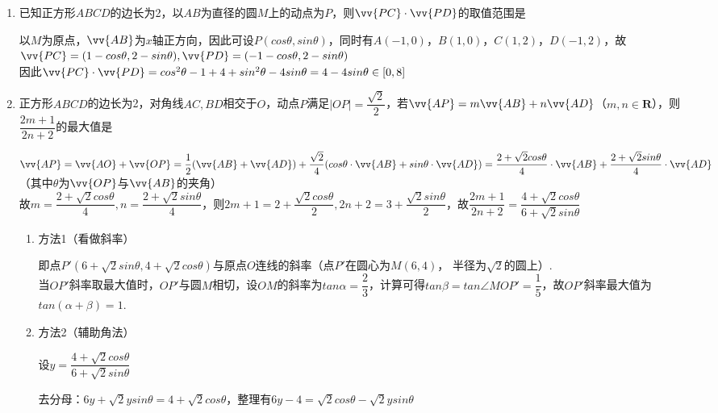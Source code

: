 \begin{enumerate}
\begin{enumerate}
        \item 已知正方形$ABCD$的边长为2，以$AB$为直径的圆$M$上的动点为$P$，则$\vv{PC} \cdot \vv{PD}$的取值范围是\blkda{$[0, 8]$}
        \begin{jieda}
            以$M$为原点，$\vv{AB}$为$x$轴正方向，因此可设$P(cos\theta, sin\theta)$，同时有$A(-1, 0)$，$B(1, 0)$，$C(1, 2)$，$D(-1, 2)$，故$\vv{PC} = (1-cos\theta, 2-sin\theta), \vv{PD} = (-1-cos\theta, 2-sin\theta)$\\
            因此$\vv{PC} \cdot \vv{PD} = cos^2\theta - 1 + 4  + sin^2\theta - 4sin\theta = 4 - 4sin\theta \in [0, 8]$
        \end{jieda}
        \item 正方形$ABCD$的边长为2，对角线$AC, BD$相交于$O$，动点$P$满足$|OP| = \dfrac{\sqrt{2}}{2}$，若$\vv{AP} = m \vv{AB} + n \vv{AD}$（$m, n \in \mathbf{R}$），则$\dfrac{2m+1}{2n+2}$的最大值是
        \begin{jieda}
            $\vv{AP} = \vv{AO} + \vv{OP} = \dfrac{1}{2}(\vv{AB} + \vv{AD}) + \dfrac{\sqrt{2}}{4}(cos\theta \cdot \vv{AB} + sin\theta \cdot \vv{AD}) = \dfrac{2+\sqrt{2}cos\theta}{4} \cdot \vv{AB} + \dfrac{2+\sqrt{2}sin\theta}{4} \cdot \vv{AD}$（其中$\theta$为$\vv{OP}$与$\vv{AB}$的夹角）\\
            故$m = \dfrac{2+\sqrt{2}cos\theta}{4}, n = \dfrac{2+\sqrt{2}sin\theta}{4}$，则$2m+1 = 2+\dfrac{\sqrt{2}cos\theta}{2}, 2n+2 = 3+\dfrac{\sqrt{2}sin\theta}{2}$，故$\dfrac{2m+1}{2n+2} = \dfrac{4+\sqrt{2}cos\theta}{6+\sqrt{2}sin\theta}$
            
            \begin{enumerate}
                \item 方法1（看做斜率）
                
                即点$P'(6+\sqrt{2}sin\theta, 4+\sqrt{2}cos\theta)$与原点$O$连线的斜率（点$P'$在圆心为$M(6, 4)$， 半径为$\sqrt{2}$的圆上）.\\
                当$OP'$斜率取最大值时，$OP'$与圆$M$相切，设$OM$的斜率为$tan\alpha = \dfrac{2}{3}$，计算可得$tan\beta = tan\angle MOP' = \dfrac{1}{5}$，故$OP'$斜率最大值为$tan(\alpha+\beta) = 1$.
                \item 方法2（辅助角法）
                
                设$y = \dfrac{4+\sqrt{2}cos\theta}{6+\sqrt{2}sin\theta}$
                
                去分母：$6y+\sqrt{2}ysin\theta = 4+\sqrt{2}cos\theta$，整理有$6y-4 = \sqrt{2}cos\theta - \sqrt{2}ysin\theta$
                

\end{enumerate}
\end{jieda}
\end{enumerate}
\end{enumerate}
